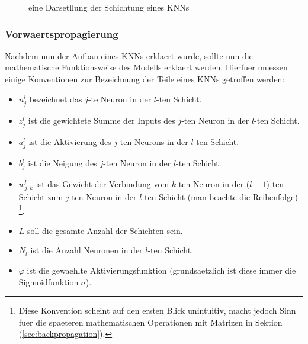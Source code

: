 \documentclass[../main]{subfiles}
\begin{document}
\begin{figure}[h!]
  \label{fi:nn_layers}
  \caption{eine Darsetllung der Schichtung eines KNNs}
\end{figure}

\subsubsection{Vorwaertspropagierung}
Nachdem nun der Aufbau eines KNNs erklaert wurde, sollte nun die mathematische Funktionsweise
des Modells erklaert werden. Hierfuer muessen einige Konventionen zur
Bezeichnung der Teile eines KNNs getroffen werden:

\begin{itemize}

\item{$n_j^l$ bezeichnet das $j$-te Neuron in der $l$-ten Schicht.}
\item{$z_j^l$ ist die gewichtete Summe der Inputs des $j$-ten Neuron in der $l$-ten Schicht.}
\item{$a_j^l$ ist die Aktivierung des $j$-ten Neurons in der $l$-ten Schicht.}
\item{$b_j^l$ ist die Neigung des $j$-ten Neuron in der $l$-ten Schicht.}
\item{$w_{j,k}^l$ ist das Gewicht der Verbindung vom $k$-ten Neuron
    in der ($l-1$)-ten Schicht zum $j$-ten Neuron in der $l$-ten Schicht (man
    beachte die Reihenfolge)
    \footnote{
      Diese Konvention scheint auf den ersten Blick unintuitiv, macht jedoch
      Sinn fuer die spaeteren mathematischen Operationen mit Matrizen in Sektion
      (\ref{sec:backpropagation}).
    }.}

\item{$L$ soll die gesamte Anzahl der Schichten sein.}

\item{$N_l$ ist die Anzahl Neuronen in der $l$-ten Schicht.} 

\item{$\varphi$ ist die gewaehlte Aktivierungsfunktion (grundsaetzlich ist diese
    immer die Sigmoidfunktion $\sigma$).}

\end{itemize}
\end{document}
